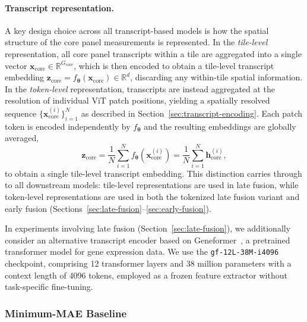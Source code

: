 \paragraph{Transcript representation.}
A key design choice across all transcript-based models is how the spatial structure of the core panel measurements is represented. In the \emph{tile-level} representation, all core panel transcripts within a tile are aggregated into a single vector $\mathbf{x}_{\text{core}} \in \mathbb{R}^{G_{\text{core}}}$, which is then encoded to obtain a tile-level transcript embedding $\mathbf{z}_{\text{core}} = f_{\boldsymbol{\theta}}(\mathbf{x}_{\text{core}}) \in \mathbb{R}^{d}$, discarding any within-tile spatial information. In the \emph{token-level} representation, transcripts are instead aggregated at the resolution of individual ViT patch positions, yielding a spatially resolved sequence $\{\mathbf{x}^{(i)}_{\text{core}}\}_{i=1}^{N}$ as described in Section~\ref{sec:transcript-encoding}. Each patch token is encoded independently by $f_{\boldsymbol{\theta}}$ and the resulting embeddings are globally averaged,
%
\begin{equation}
    \mathbf{z}_{\text{core}} = \frac{1}{N}\sum_{i=1}^{N}f_{\boldsymbol{\theta}}\!\left(\mathbf{x}_{\text{core}}^{(i)}\right) = \frac{1}{N}\sum_{i=1}^{N} \mathbf{h}_{\text{core}}^{(i)},
\end{equation}
%
to obtain a single tile-level transcript embedding. This distinction carries through to all downstream models: tile-level representations are used in late fusion, while token-level representations are used in both the tokenized late fusion variant and early fusion (Sections~\ref{sec:late-fusion}--\ref{sec:early-fusion}).

In experiments involving late fusion (Section~\ref{sec:late-fusion}), we additionally consider an alternative transcript encoder based on Geneformer~\cite{theodoris_transferlearningenables_2023}, a pretrained transformer model for gene expression data. We use the \texttt{gf-12L-38M-i4096} checkpoint, comprising 12 transformer layers and 38 million parameters with a context length of 4096 tokens, employed as a frozen feature extractor without task-specific fine-tuning.

\subsubsection{Minimum-MAE Baseline}
\label{sec:minimum-mae-baseline}

